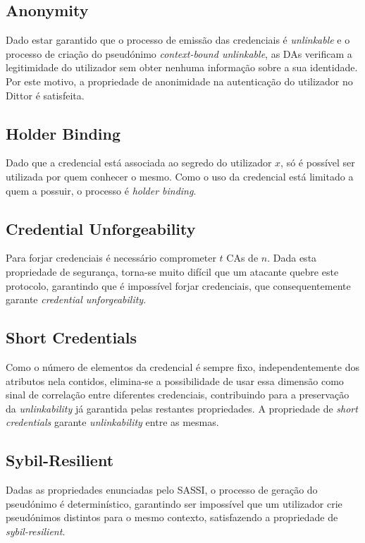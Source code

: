 \subsection{Anonymity}

Dado estar garantido que o processo de emissão das credenciais é \textit{unlinkable} e o processo de criação do pseudónimo \textit{context-bound unlinkable}, as DAs verificam a legitimidade do utilizador sem obter nenhuma informação sobre a sua identidade. Por este motivo, a propriedade de anonimidade na autenticação do utilizador no Dittor é satisfeita.

\subsection{Holder Binding}

Dado que a credencial está associada ao segredo do utilizador $x$, só é possível ser utilizada por quem conhecer o mesmo. Como o uso da credencial está limitado a quem a possuir, o processo é \textit{holder binding}.

\subsection{Credential Unforgeability}

Para forjar credenciais é necessário comprometer $t$ CAs de $n$. Dada esta propriedade de segurança, torna-se muito difícil que um atacante quebre este protocolo, garantindo que é impossível forjar credenciais, que consequentemente garante \textit{credential unforgeability}.

\subsection{Short Credentials}

Como o número de elementos da credencial é sempre fixo, independentemente dos atributos nela contidos, elimina-se a possibilidade de usar essa dimensão como sinal de correlação entre diferentes credenciais, contribuindo para a preservação da \textit{unlinkability} já garantida pelas restantes propriedades. A propriedade de \textit{short credentials} garante \textit{unlinkability} entre as mesmas.

\subsection{Sybil-Resilient}

Dadas as propriedades enunciadas pelo SASSI, o processo de geração do pseudónimo é determinístico, garantindo ser impossível que um utilizador crie pseudónimos distintos para o mesmo contexto, satisfazendo a propriedade de \textit{sybil-resilient}.

